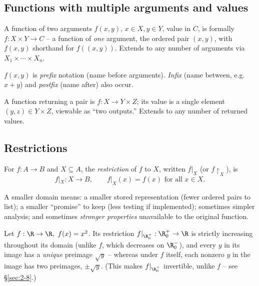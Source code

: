 \subsection{Functions with multiple arguments and values}
\label{sec:2-5}
\begin{definition}
A function of two arguments $f(x,y)$, $x \in X, y \in Y$, value in $C$, is formally $f: X \times Y \to C$ -- a function of \emph{one} argument, the ordered pair $(x,y)$, with $f(x,y)$ shorthand for $f((x,y))$. Extends to any number of arguments via $X_1 \times \cdots \times X_n$.
\end{definition}

\begin{note}
$f(x,y)$ is \emph{prefix} notation (name before arguments). \emph{Infix} (name between, e.g.\ $x+y$) and \emph{postfix} (name after) also occur.
\end{note}

\begin{definition}
A function returning a pair is $f: X \to Y \times Z$; its value is a single element $(y,z) \in Y \times Z$, viewable as ``two outputs.'' Extends to any number of returned values.
\end{definition}

\subsection{Restrictions}
\label{sec:2-6}
\begin{definition}[Restriction]
For $f: A \to B$ and $X \subseteq A$, the \emph{restriction} of $f$ to $X$, written $f|_X$ (or $f\restriction_X$), is
\[
f|_X : X \to B, \qquad f|_X(x) = f(x) \text{ for all } x \in X.
\]
\end{definition}

\begin{note}
A smaller domain means: a smaller stored representation (fewer ordered pairs to list); a smaller ``promise'' to keep (less testing if implemented); sometimes simpler analysis; and sometimes \emph{stronger properties} unavailable to the original function.
\end{note}

\begin{example}
Let $f: \R \to \R,\ f(x)=x^2$. Its restriction $f|_{\R_0^+} : \R_0^+ \to \R$ is strictly increasing throughout its domain (unlike $f$, which decreases on $\R_0^-$), and every $y$ in its image has a \emph{unique} preimage $\sqrt{y}$ -- whereas under $f$ itself, each nonzero $y$ in the image has two preimages, $\pm\sqrt{y}$. (This makes $f|_{\R_0^+}$ invertible, unlike $f$ -- see \S\ref{sec:2-8}.)
\end{example}

